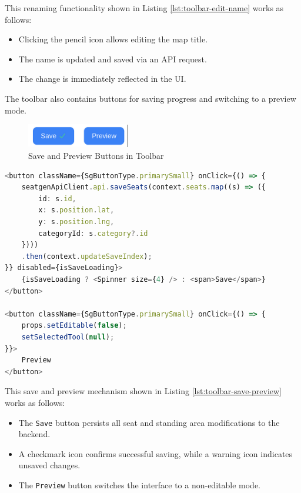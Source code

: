 This renaming functionality shown in Listing \ref{lst:toolbar-edit-name} works as follows:
\begin{itemize}
    \item Clicking the pencil icon allows editing the map title.
    \item The name is updated and saved via an API request.
    \item The change is immediately reflected in the UI.
\end{itemize}

The toolbar also contains buttons for saving progress and switching to a preview mode.

\begin{figure}[H]
    \centering
    \includegraphics[width=0.4\textwidth]{pics/toolbar02.png}
    \caption{Save and Preview Buttons in Toolbar}
    \label{fig:toolbar-save-preview}
\end{figure}

\begin{lstlisting}[language=TypeScript, caption=Saving and Previewing, label=lst:toolbar-save-preview]
<button className={SgButtonType.primarySmall} onClick={() => {
    seatgenApiClient.api.saveSeats(context.seats.map((s) => ({
        id: s.id,
        x: s.position.lat,
        y: s.position.lng,
        categoryId: s.category?.id
    })))
    .then(context.updateSaveIndex);
}} disabled={isSaveLoading}>
    {isSaveLoading ? <Spinner size={4} /> : <span>Save</span>}
</button>

<button className={SgButtonType.primarySmall} onClick={() => {
    props.setEditable(false);
    setSelectedTool(null);
}}>
    Preview
</button>
\end{lstlisting}

This save and preview mechanism shown in Listing \ref{lst:toolbar-save-preview} works as follows:
\begin{itemize}
    \item The \texttt{Save} button persists all seat and standing area modifications to the backend.
    \item A checkmark icon confirms successful saving, while a warning icon indicates unsaved changes.
    \item The \texttt{Preview} button switches the interface to a non-editable mode.
\end{itemize}

